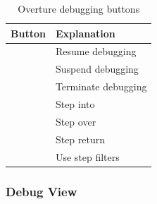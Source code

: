 \documentclass{overturerep}
\begin{document}
{\begin{table}
\begin{center}
\caption{Overture debugging buttons\label{tab:debugButtons}}
\begin{tabular}{|l|l|}\hline \hline
\textbf{Button} & \textbf{Explanation} \\ \hline
\includegraphics[width=0.03\textwidth]{figures/resume} & Resume
debugging\index{icon!resume debugging} \\
\includegraphics[width=0.03\textwidth]{figures/suspend} & Suspend
debugging\index{icon!suspend debugging}\\
\includegraphics[width=0.03\textwidth]{figures/terminate} & Terminate
debugging\index{icon!terminate debugging}\\
\includegraphics[width=0.03\textwidth]{figures/stepinto} & Step
into\index{icon!step into}\\
\includegraphics[width=0.03\textwidth]{figures/stepover} & Step
over\index{icon!step over} \\
\includegraphics[width=0.03\textwidth]{figures/stepreturn} & Step
return\index{icon!step return}\\
\includegraphics[width=0.03\textwidth]{figures/stepbystep} & Use step
filters\index{icon!use step filters}\\
\hline \hline
\end{tabular}
\end{center}
\end{table}

\subsubsection{Debug View}

}
\end{document}
